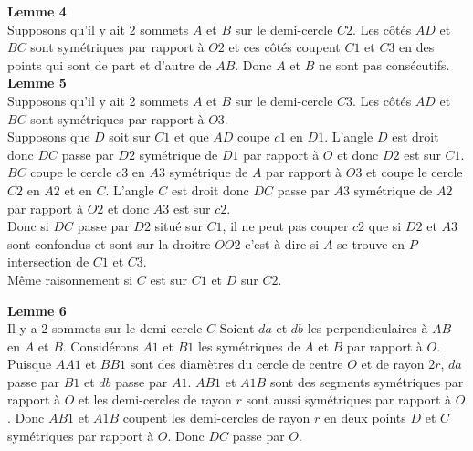 \documentclass[a4paper,11pt]{book}
\begin{document}
{\bf Lemme 4}\\
Supposons  qu'il y ait 2 sommets $A$ et $B$ sur le demi-cercle $C2$. Les 
c\^ot\'es $AD$ et $BC$ sont sym\'etriques par rapport \`a $O2$ et ces 
c\^ot\'es coupent $C1$ et $C3$ en des points qui sont de part et d'autre de 
$AB$. Donc $A$ et $B$ ne sont pas cons\'ecutifs.\\

{\bf Lemme 5}\\
Supposons  qu'il y ait 2 sommets $A$ et $B$ sur le demi-cercle $C3$. Les 
c\^ot\'es $AD$ et $BC$ sont sym\'etriques par rapport \`a $O3$.\\
Supposons que $D$ soit sur $C1$ et que $AD$ coupe $c1$ en 
$D1$. L'angle $D$ est droit donc $DC$ passe par $D2$ sym\'etrique de $D1$ par 
rapport \`a $O$ et donc $D2$ est sur $C1$.\\
$BC$ coupe le cercle $c3$ en $A3$ sym\'etrique de $A$ par rapport \`a $O3$ et 
coupe le cercle $C2$ en $A2$ et en $C$. L'angle $C$ est droit donc $DC$ passe 
par $A3$ sym\'etrique de $A2$ par rapport \`a $O2$ et donc $A3$ est sur $c2$.\\
Donc si $DC$ passe par $D2$ situ\'e sur $C1$, il ne peut pas couper $c2$ que si $D2$ et $A3$ sont confondus et sont sur la droitre $OO2$ c'est \`a dire si $A$ 
se trouve en $P$ intersection de $C1$ et $C3$.\\
M\^eme raisonnement si $C$ est sur $C1$ et $D$ sur $C2$.  

{\bf Lemme 6}\\
Il y a 2 sommets sur le demi-cercle $C$ 
Soient $da$ et $db$ les perpendiculaires \`a $AB$ en $A$ et $B$. Consid\'erons 
$A1$ et $B1$ les sym\'etriques de $A$ et $B$ par rapport \`a $O$. Puisque $AA1$
et $BB1$ sont des diam\`etres du cercle  de centre $O$ et de rayon $2r$,  $da$
 passe par $B1$ et $db$ passe par $A1$. $AB1$ et $A1B$ sont des segments 
sym\'etriques par rapport \`a $O$ et les demi-cercles de rayon $r$ sont aussi 
sym\'etriques par rapport \`a $O$. Donc $AB1$ et $A1B$ coupent les demi-cercles de rayon $r$ en deux points  $D$ et $C$  sym\'etriques par rapport \`a $O$.
Donc $DC$ passe par $O$.
\end{document}
